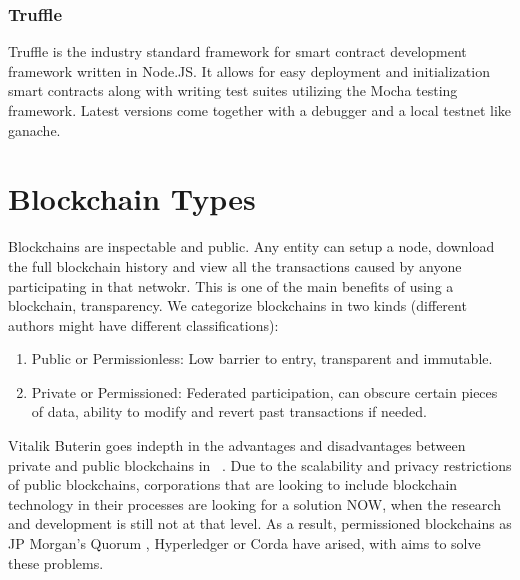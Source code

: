 


\subsubsection{Truffle}
Truffle is the industry standard framework for smart contract development framework written in Node.JS. It allows for easy deployment and initialization smart contracts along with writing test suites utilizing the Mocha testing framework. Latest versions come together with a debugger and a local testnet like ganache. 

\section{Blockchain Types}
Blockchains are inspectable and public. Any entity can setup a node, download the full blockchain history and view all the transactions caused by anyone participating in that netwokr. This is one of the main benefits of using a blockchain, transparency.
We categorize blockchains in two kinds (different authors might have different classifications):
\begin{enumerate}
    \item Public or Permissionless: Low barrier to entry, transparent and immutable.
    \item Private or Permissioned: Federated participation, can obscure certain pieces of data, ability to modify and revert past transactions if needed.
\end{enumerate}

Vitalik Buterin goes indepth in the advantages and disadvantages between private and public blockchains in ~\cite{publicprivate}. Due to the scalability and privacy restrictions of public blockchains, corporations that are looking to include blockchain technology in their processes are looking for a solution NOW, when the research and development is still not at that level. As a result, permissioned blockchains as JP Morgan's Quorum \cite{quorum}, Hyperledger or Corda have arised, with aims to solve these problems.
